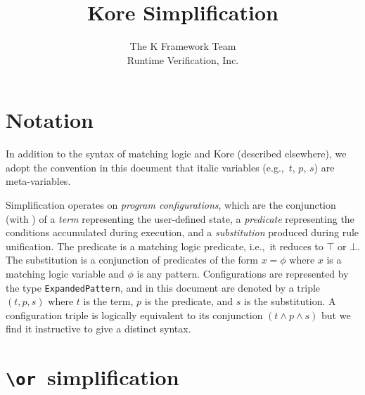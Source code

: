\documentclass[12pt]{report}
\def\ie{{i.e.},\ }
\def\eg{{e.g.},\ }
\newcommand{\slsh}[1]{\texttt{\fontsize{10pt}{12pt}\textbackslash{#1}}}
\newcommand{\slor}{\slsh{or}}
\begin{document}
\lstset{language=[light]Haskell,style=inline}

\title{Kore Simplification}
\author{%
The K Framework Team\\%
Runtime Verification, Inc.%
}
\date{}

\maketitle

\chapter{Notation}
\label{cha:notation}

In addition to the syntax of matching logic and Kore (described elsewhere),
we adopt the convention in this document that italic variables (\eg $t$, $p$, $s$) are meta-variables.

Simplification operates on \emph{program configurations},
which are the conjunction (with \wedge) of
a \emph{term} representing the user-defined state,
a \emph{predicate} representing the conditions accumulated during execution,
and a \emph{substitution} produced during rule unification.
The predicate is a matching logic predicate, \ie it reduces to $\top$ or $\bot$.
The substitution is a conjunction of predicates of the form
\(
x = \phi
\)
where $x$ is a matching logic variable and $\phi$ is any pattern.
Configurations are represented by the type \lstinline!ExpandedPattern!,
and in this document are denoted by a triple
\(
(t, p, s)
\)
where $t$ is the term, $p$ is the predicate, and $s$ is the substitution.
A configuration triple is logically equivalent to its conjunction
\(
(t \wedge p \wedge s)
\)
but we find it instructive to give a distinct syntax.

\chapter{\slor~simplification}
\label{cha:or-simplification}


\end{document}
